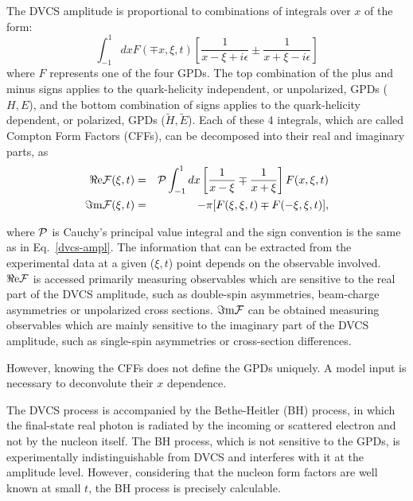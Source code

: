 The DVCS amplitude is proportional to combinations of integrals over $x$ of the form: 
\begin{equation}\label{dvcs-ampl}
\int_{-1}^{1} d x F(\mp x,\xi,t)\left[\frac{1}{x - \xi + i \epsilon}\pm\frac{1}{x + \xi - i \epsilon}\right]
\end{equation}
where $F$ represents one of the four GPDs. The top combination of the plus and minus signs applies to the quark-helicity independent, or unpolarized, GPDs ($H, E$), and the bottom combination of signs applies to the quark-helicity dependent, or polarized, GPDs ($\widetilde {H}, \widetilde {E}$). Each of these 4 integrals, which are called Compton Form Factors (CFFs), can be decomposed into their real and imaginary parts, as
\begin{eqnarray}\label{def_cffs1}
\Re{\rm e}{\cal F} (\xi,t)&=& {\cal P}\int_{-1}^{1}dx\left[\frac{1}{x-\xi}\mp\frac{1}{x+\xi}\right]F(x,\xi,t) \\
\Im{\rm m}{\cal F}(\xi,t)&=& -\pi [F(\xi,\xi,t)\mp F(-\xi,\xi,t)], \label{def_cffs2}
\end{eqnarray}

where ${\cal P}$ is Cauchy's principal value integral and the sign convention is the same as in Eq.~\ref{dvcs-ampl}. The information that can be extracted from the experimental data at a given ($\xi,t$) point depends on the observable involved. 
$\Re{\rm e}{\cal F}$ is accessed primarily measuring observables which are sensitive to the real part of the DVCS amplitude, such as double-spin asymmetries, beam-charge asymmetries or unpolarized cross sections. 
$\Im{\rm m}{\cal F}$ can be obtained measuring observables which are mainly sensitive to the imaginary part of the DVCS amplitude, such as single-spin asymmetries or cross-section differences. 

However, knowing the CFFs does not define the GPDs uniquely. A model input is necessary to deconvolute their $x$ dependence.

The DVCS process is accompanied by the Bethe-Heitler (BH) process, in which the final-state real photon is radiated by the incoming or scattered electron and not by the nucleon itself. The BH process, which is not sensitive to the GPDs, is experimentally indistinguishable from DVCS and interferes with it at the amplitude level. However, considering that the nucleon form factors are well known at small $t$, the BH process is precisely calculable.
